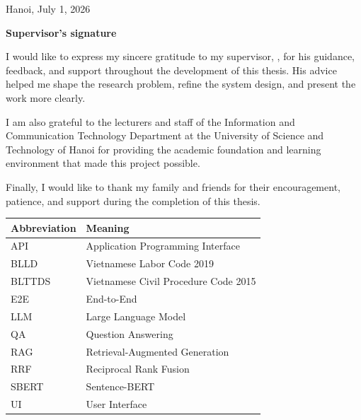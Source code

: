 \documentclass[11pt]{extarticle}
\begin{document}
\vspace{2.4cm}
\begin{flushright}
\begin{minipage}{0.36\textwidth}
\centering
Hanoi, July 1, 2026

\vspace{0.75cm}
{\bfseries Supervisor's signature}
\end{minipage}
\end{flushright}

\clearpage
\renewcommand{\contentsname}{TABLE OF CONTENTS}
\tableofcontents

I would like to express my sincere gratitude to my supervisor, \thesissupervisor, for his guidance, feedback, and support throughout the development of this thesis. His advice helped me shape the research problem, refine the system design, and present the work more clearly.

I am also grateful to the lecturers and staff of the Information and Communication Technology Department at the University of Science and Technology of Hanoi for providing the academic foundation and learning environment that made this project possible.

Finally, I would like to thank my family and friends for their encouragement, patience, and support during the completion of this thesis.

\begin{table}[H]
  \centering
  \begin{tabular}{@{}ll@{}}
    \toprule
    Abbreviation & Meaning \\
    \midrule
    API & Application Programming Interface \\
    BLLD & Vietnamese Labor Code 2019 \\
    BLTTDS & Vietnamese Civil Procedure Code 2015 \\
    E2E & End-to-End \\
    LLM & Large Language Model \\
    QA & Question Answering \\
    RAG & Retrieval-Augmented Generation \\
    RRF & Reciprocal Rank Fusion \\
    SBERT & Sentence-BERT \\
    UI & User Interface \\
    \bottomrule
  \end{tabular}
\end{table}
\end{document}
